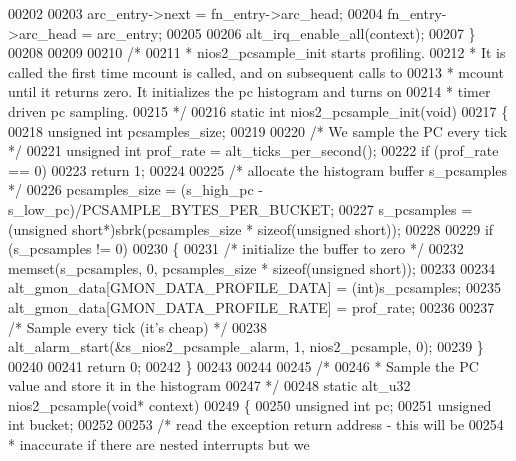 \begin{DoxyCode}
{00202 
00203   arc\_entry->next = fn\_entry->arc_head;
00204   fn\_entry->arc_head = arc\_entry;
00205 
00206   alt_irq_enable_all(context);
00207 \}
00208 
00209 
00210 \textcolor{comment}{/*}
00211 \textcolor{comment}{ * nios2\_pcsample\_init starts profiling.}
00212 \textcolor{comment}{ * It is called the first time mcount is called, and on subsequent calls to}
00213 \textcolor{comment}{ * mcount until it returns zero. It initializes the pc histogram and turns on}
00214 \textcolor{comment}{ * timer driven pc sampling.}
00215 \textcolor{comment}{ */}
00216 \textcolor{keyword}{static} \textcolor{keywordtype}{int} nios2_pcsample_init(\textcolor{keywordtype}{void})
00217 \{
00218   \textcolor{keywordtype}{unsigned} \textcolor{keywordtype}{int} pcsamples\_size; 
00219 
00220   \textcolor{comment}{/* We sample the PC every tick */}
00221   \textcolor{keywordtype}{unsigned} \textcolor{keywordtype}{int} prof\_rate = alt_ticks_per_second();
00222   \textcolor{keywordflow}{if} (prof\_rate == 0)
00223     \textcolor{keywordflow}{return} 1;
00224 
00225   \textcolor{comment}{/* allocate the histogram buffer s\_pcsamples */}
00226   pcsamples\_size = (s\_high\_pc - s\_low\_pc)/PCSAMPLE_BYTES_PER_BUCKET;
00227   s\_pcsamples    = (\textcolor{keywordtype}{unsigned} \textcolor{keywordtype}{short}*)sbrk(pcsamples\_size * \textcolor{keyword}{sizeof}(\textcolor{keywordtype}{unsigned} \textcolor{keywordtype}{short}));
00228 
00229   \textcolor{keywordflow}{if} (s\_pcsamples != 0)
00230   \{
00231     \textcolor{comment}{/* initialize the buffer to zero */}
00232     memset(s\_pcsamples, 0, pcsamples\_size * \textcolor{keyword}{sizeof}(\textcolor{keywordtype}{unsigned} \textcolor{keywordtype}{short}));
00233 
00234     alt\_gmon\_data[GMON_DATA_PROFILE_DATA] = (int)s\_pcsamples;
00235     alt\_gmon\_data[GMON_DATA_PROFILE_RATE] = prof\_rate;
00236 
00237     \textcolor{comment}{/* Sample every tick (it's cheap) */}
00238     alt_alarm_start(&s\_nios2\_pcsample\_alarm, 1, nios2_pcsample, 0);
00239   \}
00240 
00241   \textcolor{keywordflow}{return} 0;
00242 \}
00243 
00244 
00245 \textcolor{comment}{/*}
00246 \textcolor{comment}{ * Sample the PC value and store it in the histogram}
00247 \textcolor{comment}{ */}
00248 \textcolor{keyword}{static} alt_u32 nios2_pcsample(\textcolor{keywordtype}{void}* context)
00249 \{
00250   \textcolor{keywordtype}{unsigned} \textcolor{keywordtype}{int} pc;
00251   \textcolor{keywordtype}{unsigned} \textcolor{keywordtype}{int} bucket;
00252 
00253   \textcolor{comment}{/* read the exception return address - this will be}
00254 \textcolor{comment}{   * inaccurate if there are nested interrupts but we}
}
\end{DoxyCode}
